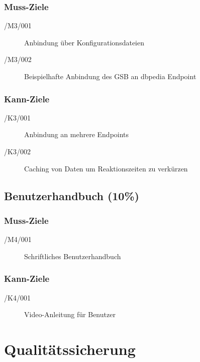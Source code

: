 \subsubsection*{Muss-Ziele}

\begin{description}
\item[/M3/001] Anbindung über Konfigurationsdateien
\item[/M3/002] Beispielhafte Anbindung des GSB an dbpedia Endpoint 
\end{description}

\subsubsection*{Kann-Ziele}

\begin{description}
\item[/K3/001] Anbindung an mehrere Endpoints
\item[/K3/002] Caching von Daten um Reaktionszeiten zu verkürzen
\end{description}

\subsection{Benutzerhandbuch (10\%)}
 
\subsubsection*{Muss-Ziele}

\begin{description}
\item[/M4/001] Schriftliches Benutzerhandbuch
\end{description}

\subsubsection*{Kann-Ziele}

\begin{description}
\item[/K4/001] Video-Anleitung für Benutzer
\end{description}

\section{Qualitätssicherung}

